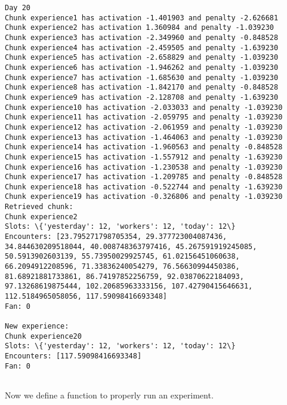 \documentclass[11pt]{article}
\begin{document}
\begin{Verbatim}[commandchars=\\\{\}]
Day 20
Chunk experience1 has activation -1.401903 and penalty -2.626681
Chunk experience2 has activation 1.360984 and penalty -1.039230
Chunk experience3 has activation -2.349960 and penalty -0.848528
Chunk experience4 has activation -2.459505 and penalty -1.639230
Chunk experience5 has activation -2.658829 and penalty -1.039230
Chunk experience6 has activation -1.946262 and penalty -1.039230
Chunk experience7 has activation -1.685630 and penalty -1.039230
Chunk experience8 has activation -1.842170 and penalty -0.848528
Chunk experience9 has activation -2.128708 and penalty -1.639230
Chunk experience10 has activation -2.033033 and penalty -1.039230
Chunk experience11 has activation -2.059795 and penalty -1.039230
Chunk experience12 has activation -2.061959 and penalty -1.039230
Chunk experience13 has activation -1.464063 and penalty -1.039230
Chunk experience14 has activation -1.960563 and penalty -0.848528
Chunk experience15 has activation -1.557912 and penalty -1.639230
Chunk experience16 has activation -1.230538 and penalty -1.039230
Chunk experience17 has activation -1.209785 and penalty -0.848528
Chunk experience18 has activation -0.522744 and penalty -1.639230
Chunk experience19 has activation -0.326806 and penalty -1.039230
Retrieved chunk:
Chunk experience2
Slots: \{'yesterday': 12, 'workers': 12, 'today': 12\}
Encounters: [23.795271798705354, 29.377723004087436, 34.844630209518044, 40.008748363797416, 45.267591919245085, 50.5913902603139, 55.73950029925745, 61.02156451060638, 66.2094912208596, 71.33836240054279, 76.56630994450386, 81.68921881733861, 86.74197852256759, 92.03870622184093, 97.13268619875444, 102.20685963333156, 107.42790415646631, 112.5184965058056, 117.59098416693348]
Fan: 0

New experience:
Chunk experience20
Slots: \{'yesterday': 12, 'workers': 12, 'today': 12\}
Encounters: [117.59098416693348]
Fan: 0


    \end{Verbatim}

    Now we define a function to properly run an experiment.
\end{document}
